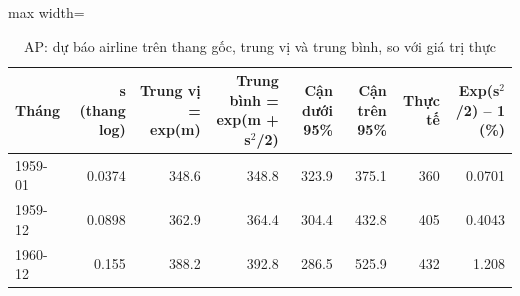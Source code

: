 \begin{table}[H]
\centering\small
\caption{AP: dự báo airline trên thang gốc, trung vị và trung bình, so với giá trị thực}\label{tab:tab_b12_09_ap_backtransform}
\begin{adjustbox}{max width=\linewidth}
\begin{tabular}{lrrrrrrr}
\toprule
Tháng & s (thang log) & Trung vị = exp(m) & Trung bình = exp(m + s$^{2}$/2) & Cận dưới 95\% & Cận trên 95\% & Thực tế & Exp(s$^{2}$/2) – 1 (\%) \\
\midrule
1959-01 & 0.0374 & 348.6 & 348.8 & 323.9 & 375.1 & 360 & 0.0701 \\
1959-12 & 0.0898 & 362.9 & 364.4 & 304.4 & 432.8 & 405 & 0.4043 \\
1960-12 & 0.155 & 388.2 & 392.8 & 286.5 & 525.9 & 432 & 1.208 \\
\bottomrule
\end{tabular}
\end{adjustbox}
\end{table}
